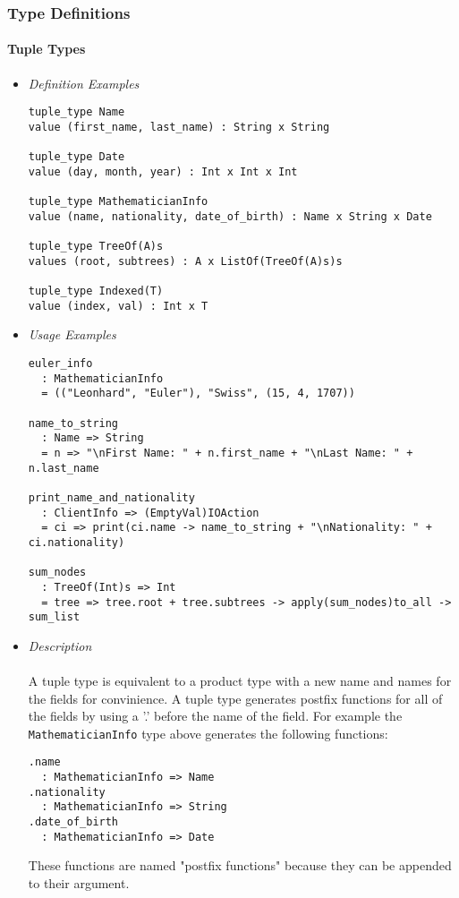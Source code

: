\documentclass{article}
\begin{document}
\subsubsection{Type Definitions}
\label{subsubsec:tdefs}

\paragraph{Tuple Types}

\begin{itemize}
\item \textit{Definition Examples}

\begin{verbatim}
tuple_type Name
value (first_name, last_name) : String x String

tuple_type Date
value (day, month, year) : Int x Int x Int

tuple_type MathematicianInfo
value (name, nationality, date_of_birth) : Name x String x Date

tuple_type TreeOf(A)s
values (root, subtrees) : A x ListOf(TreeOf(A)s)s

tuple_type Indexed(T)
value (index, val) : Int x T
\end{verbatim}

\item \textit{Usage Examples}

\begin{verbatim}
euler_info
  : MathematicianInfo
  = (("Leonhard", "Euler"), "Swiss", (15, 4, 1707))

name_to_string
  : Name => String
  = n => "\nFirst Name: " + n.first_name + "\nLast Name: " + n.last_name

print_name_and_nationality
  : ClientInfo => (EmptyVal)IOAction
  = ci => print(ci.name -> name_to_string + "\nNationality: " + ci.nationality)

sum_nodes
  : TreeOf(Int)s => Int
  = tree => tree.root + tree.subtrees -> apply(sum_nodes)to_all -> sum_list
\end{verbatim}

\item \textit{Description} \\\\
A tuple type is equivalent to a product type with a new name  and names for the
fields for convinience. A tuple type generates postfix functions for all of
the fields by using a '.' before the name of the field. For example the
\texttt{MathematicianInfo} type above generates the following functions:
\begin{verbatim}
.name
  : MathematicianInfo => Name
.nationality
  : MathematicianInfo => String
.date_of_birth
  : MathematicianInfo => Date
\end{verbatim}
These functions are named "postfix functions" because they can be appended to
their argument.


\end{itemize}
\end{document}
